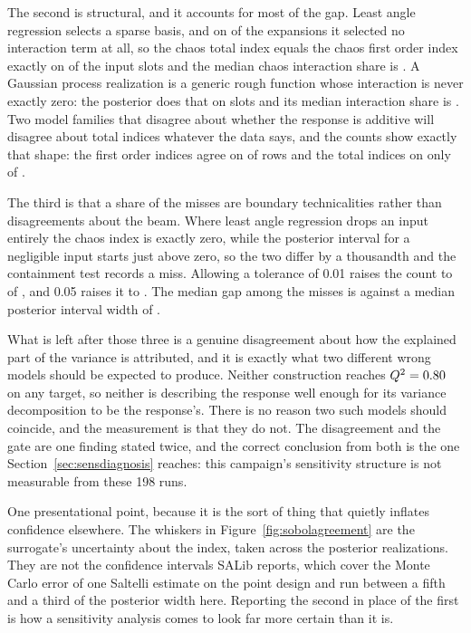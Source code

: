 \documentclass[11pt,a4paper]{article}
\begin{document}
The second is structural, and it accounts for most of the gap. Least angle regression selects a
sparse basis, and on \SensNoInteractionExpansions{} of the \SensTargets{} expansions it selected
no interaction term at all, so the chaos total index equals the chaos first order index exactly
on \SensAdditiveSlots{} of the \SensInputSlots{} input slots and the median chaos interaction
share is \SensChaosInteraction{}. A Gaussian process realization is a generic rough function
whose interaction is never exactly zero: the posterior does that on
\SensPosteriorAdditiveSlots{} slots and its median interaction share is
\SensPosteriorInteraction{}. Two model families that disagree about whether the response is
additive will disagree about total indices whatever the data says, and the counts show exactly
that shape: the first order indices agree on \SensAgreeFirst{} of \SensAgreeFirstRows{} rows and
the total indices on only \SensAgreeTotal{} of \SensAgreeTotalRows{}.

The third is that a share of the misses are boundary technicalities rather than disagreements
about the beam. Where least angle regression drops an input entirely the chaos index is exactly
zero, while the posterior interval for a negligible input starts just above zero, so the two
differ by a thousandth and the containment test records a miss. Allowing a tolerance of 0.01
raises the count to \SensAgreeWithinOnePct{} of \SensAgreeRows{}, and 0.05 raises it to
\SensAgreeWithinFivePct{}. The median gap among the misses is \SensGapMedian{} against a median
posterior interval width of \SensPosteriorWidthMedian{}.

What is left after those three is a genuine disagreement about how the explained part of the
variance is attributed, and it is exactly what two different wrong models should be expected to
produce. Neither construction reaches $Q^2 = 0.80{}$ on any target, so neither is
describing the response well enough for its variance decomposition to be the response's. There
is no reason two such models should coincide, and the measurement is that they do not. The
disagreement and the gate are one finding stated twice, and the correct conclusion from both is
the one Section~\ref{sec:sensdiagnosis} reaches: this campaign's sensitivity structure is not
measurable from these 198 runs.

One presentational point, because it is the sort of thing that quietly inflates confidence
elsewhere. The whiskers in Figure~\ref{fig:sobolagreement} are the surrogate's uncertainty about
the index, taken across the \SensRealizations{} posterior realizations. They are not the
confidence intervals SALib \cite{salib} reports, which cover the Monte Carlo error of one Saltelli estimate
on the \SensDesignRows{} point design and run between a fifth and a third of the posterior
width here. Reporting the second in place of the first is how a sensitivity analysis comes to
look far more certain than it is.
\end{document}

